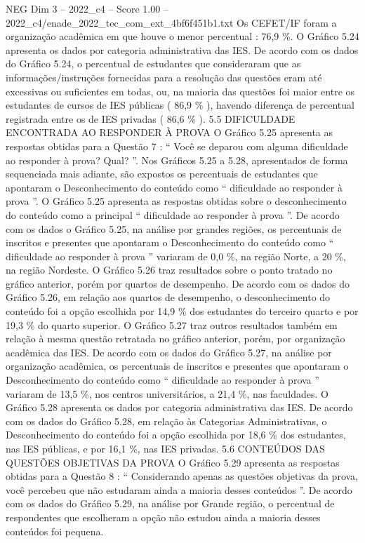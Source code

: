 \begin{textsample}{NEG Dim 3 – 2022\_c4 – Score 1.00 – 2022\_c4/enade\_2022\_tec\_com\_ext\_4bf6f451b1.txt}
Os CEFET/IF foram a organização acadêmica em que houve o menor percentual : 76,9 \%.
O Gráfico 5.24 apresenta os dados por categoria administrativa das IES.
De acordo com os dados do Gráfico 5.24, o percentual de estudantes que consideraram que as informações/instruções fornecidas para a resolução das questões eram até excessivas ou suficientes em todas, ou, na maioria das questões foi maior entre os estudantes de cursos de IES públicas ( 86,9 \% ), havendo diferença de percentual registrada entre os de IES privadas ( 86,6 \% ). 5.5 DIFICULDADE ENCONTRADA AO RESPONDER À PROVA O Gráfico 5.25 apresenta as respostas obtidas para a Questão 7 : “ Você se deparou com alguma dificuldade ao responder à prova?
Qual? ”.
Nos Gráficos 5.25 a 5.28, apresentados de forma sequenciada mais adiante, são expostos os percentuais de estudantes que apontaram o Desconhecimento do conteúdo como “ dificuldade ao responder à prova ”.
O Gráfico 5.25 apresenta as respostas obtidas sobre o desconhecimento do conteúdo como a principal “ dificuldade ao responder à prova ”.
De acordo com os dados o Gráfico 5.25, na análise por grandes regiões, os percentuais de inscritos e presentes que apontaram o Desconhecimento do conteúdo como “ dificuldade ao responder à prova ” variaram de 0,0 \%, na região Norte, a 20 \%, na região Nordeste.
O Gráfico 5.26 traz resultados sobre o ponto tratado no gráfico anterior, porém por quartos de desempenho.
De acordo com os dados do Gráfico 5.26, em relação aos quartos de desempenho, o desconhecimento do conteúdo foi a opção escolhida por 14,9 \% dos estudantes do terceiro quarto e por 19,3 \% do quarto superior.
O Gráfico 5.27 traz outros resultados também em relação à mesma questão retratada no gráfico anterior, porém, por organização acadêmica das IES.
De acordo com os dados do Gráfico 5.27, na análise por organização acadêmica, os percentuais de inscritos e presentes que apontaram o Desconhecimento do conteúdo como “ dificuldade ao responder à prova ” variaram de 13,5 \%, nos centros universitários, a 21,4 \%, nas faculdades.
O Gráfico 5.28 apresenta os dados por categoria administrativa das IES.
De acordo com os dados do Gráfico 5.28, em relação às Categorias Administrativas, o Desconhecimento do conteúdo foi a opção escolhida por 18,6 \% dos estudantes, nas IES públicas, e por 16,1 \%, nas IES privadas. 5.6 CONTEÚDOS DAS QUESTÕES OBJETIVAS DA PROVA O Gráfico 5.29 apresenta as respostas obtidas para a Questão 8 : “ Considerando apenas as questões objetivas da prova, você percebeu que não estudaram ainda a maioria desses conteúdos ”.
De acordo com os dados do Gráfico 5.29, na análise por Grande região, o percentual de respondentes que escolheram a opção não estudou ainda a maioria desses conteúdos foi pequena.

\end{textsample}
